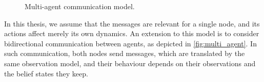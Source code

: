 \begin{wrapfigure}{r}{6cm}
	\centering
	\vspace{20pt}
	\caption[Multi-agent communication model]{Multi-agent communication model.}
	\label{fig:multi_agent}
\end{wrapfigure}
In this thesis, we assume that the messages are relevant for a single node, and its actions affect merely its own dynamics. An extension to this model is to consider bidirectional communication between agents, as depicted in \autoref{fig:multi_agent}. In such communication, both nodes send messages, which are translated by the same observation model, and their behaviour depends on their observations and the belief states they keep. 

